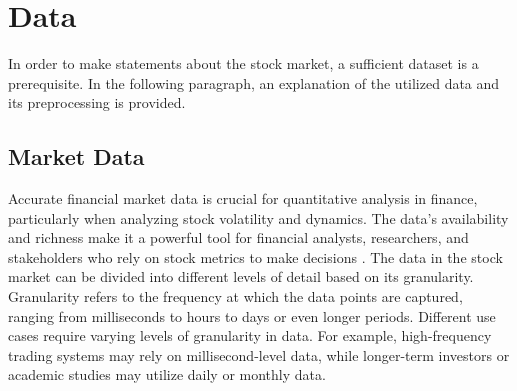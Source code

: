 \documentclass[12pt]{article}
\begin{document}

\section{Data }
\label{subsec:data}
In order to make statements about the stock market, a sufficient dataset is a prerequisite. In the following paragraph, an explanation of the utilized data and its preprocessing is provided.

\subsection{Market Data}%
Accurate financial market data is crucial for quantitative analysis in finance, particularly when analyzing stock volatility and dynamics. The data's availability and richness make it a powerful tool for financial analysts, researchers, and stakeholders who rely on stock metrics to make decisions \cite{Shen2020}.
The data in the stock market can be divided into different levels of detail based on its granularity. Granularity refers to the frequency at which the data points are captured, ranging from milliseconds to hours to days or even longer periods. Different use cases require varying levels of granularity in data. For example, high-frequency trading systems may rely on millisecond-level data, while longer-term investors or academic studies may utilize daily or monthly data.
\end{document}
